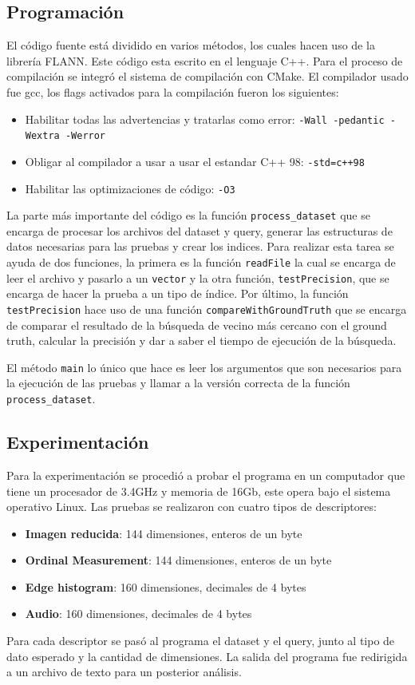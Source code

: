\documentclass{article}
\begin{document}
	\subsection{Programación}
	El código fuente está dividido en varios métodos, los cuales hacen uso de la librería FLANN. Este código esta
	escrito en el lenguaje C++. Para el proceso de compilación se integró el sistema de compilación con CMake. El compilador 
	usado fue gcc, los flags activados para la compilación fueron los siguientes:
	\begin{itemize}
		\item Habilitar todas las advertencias y tratarlas como error: \texttt{-Wall -pedantic -Wextra -Werror}
		\item Obligar al compilador a usar a usar el estandar C++ 98: \texttt{-std=c++98}
		\item Habilitar las optimizaciones de código: \texttt{-O3}
	\end{itemize}	
	La parte más importante del código es la función \texttt{process\_dataset} que se encarga de procesar los archivos del dataset y query, generar las estructuras de datos necesarias para las pruebas y crear los indices. Para realizar esta tarea se ayuda de dos funciones, la primera es la función \texttt{readFile} la cual se encarga de leer el archivo y pasarlo a un \texttt{vector} y la otra función, \texttt{testPrecision}, que se encarga de hacer la prueba a un tipo de índice. Por último, la función \texttt{testPrecision} hace uso de una función \texttt{compareWithGroundTruth} que se encarga de comparar el resultado de la búsqueda de vecino más cercano con el ground truth, calcular la precisión y dar a saber el tiempo de ejecución de la búsqueda.
	
	El método \texttt{main} lo único que hace es leer los argumentos que son necesarios para la ejecución de las pruebas y llamar a la versión correcta de la función \texttt{process\_dataset}.
	
	\subsection{Experimentación}
	Para la experimentación se procedió a probar el programa en un computador que tiene un procesador de 3.4GHz y memoria de 16Gb, este opera bajo el sistema operativo Linux. Las pruebas se realizaron con cuatro tipos de descriptores:
	\begin{itemize}
		\item \textbf{Imagen reducida}: 144 dimensiones, enteros de un byte
		\item \textbf{Ordinal Measurement}: 144 dimensiones, enteros de un byte
		\item \textbf{Edge histogram}: 160 dimensiones, decimales de 4 bytes
		\item \textbf{Audio}: 160 dimensiones, decimales de 4 bytes
	\end{itemize}
	Para cada descriptor se pasó al programa el dataset y el query, junto al tipo de dato esperado y la cantidad de dimensiones. La salida del programa fue redirigida a un archivo de texto para un posterior análisis.
	
\end{document}
